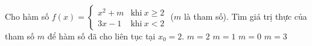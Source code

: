 \begin{ex}%
	Cho hàm số $f(x) = \begin{cases}   
	x^2 + m &\text{khi} \ x \geq 2 \\ 3x -1 &\text{khi}\ x < 2\end{cases}$ ($m$ là tham số). Tìm giá trị thực của tham số $m$ để hàm số đã cho liên tục tại $x_0 = 2$.
	\choice
	{$m = 2$}
	{\True $m = 1$}
	{$m = 0$}
	{$m = 3$}
\end{ex}

